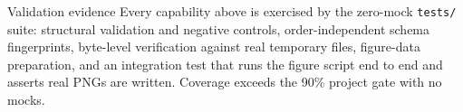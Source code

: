 \documentclass[
  ignorenonframetext,
]{beamer}
\begin{document}
\begin{frame}{Validation evidence}
\protect{}\label{validation-evidence}
Every capability above is exercised by the zero-mock \texttt{tests/}
suite: structural validation and negative controls, order-independent
schema fingerprints, byte-level verification against real temporary
files, figure-data preparation, and an integration test that runs the
figure script end to end and asserts real PNGs are written. Coverage
exceeds the 90\% project gate with no mocks.
\end{frame}
\end{document}
